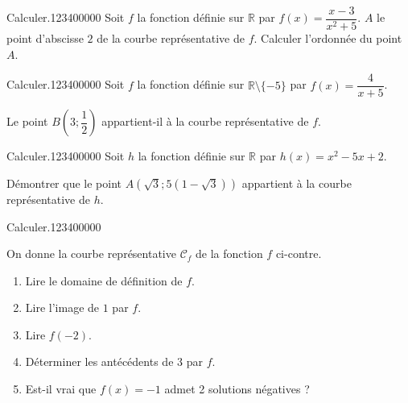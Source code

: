 \begin{pageAD} 

 

\begin{ExoCad}{Calculer.}{1234}{0}{0}{0}{0}{0}
Soit $f$ la fonction définie sur $\mathbb R$ par $f(x)=\dfrac{x-3}{x^2+5}$. $A$ le point d'abscisse $2$ de la courbe représentative de $f$. Calculer l'ordonnée du point $A$. 

\end{ExoCad}


\begin{ExoCad}{Calculer.}{1234}{0}{0}{0}{0}{0}
Soit $f$ la fonction définie sur $\mathbb R \setminus \lbrace -5\rbrace$ par $f(x)=\dfrac{4}{x+5}$. 

Le point $B\left(3; \dfrac{1}{2}\right)$ appartient-il à la courbe représentative de $f$.

\end{ExoCad}



\begin{ExoCad}{Calculer.}{1234}{0}{0}{0}{0}{0}
Soit $h$ la fonction définie sur $\mathbb R$ par $h(x)=x^2-5x+2$. 

Démontrer que le point $A\left( \sqrt 3 ;  5\left(1-\sqrt 3\right) \right)$ appartient à la courbe représentative de $h$.

\end{ExoCad}



\begin{ExoCad}{Calculer.}{1234}{0}{0}{0}{0}{0}


\begin{minipage}{0.5\linewidth}
\vspace{0.4cm}
On donne la courbe représentative $\mathcal C_f$ de la fonction $f$ ci-contre.  

\begin{enumerate}
\item Lire le domaine de définition de $f$. 
\item Lire l'image de $1$ par $f$.  
\item Lire $f(-2)$. 
\item Déterminer les antécédents de $3$ par $f$. 
\item Est-il vrai que $f(x)=-1$ admet 2 solutions négatives ? 
\end{enumerate}
\end{minipage}
\begin{minipage}{0.5\linewidth}


\end{minipage}
\end{ExoCad}
\end{pageAD}
